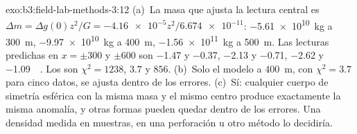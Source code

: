 \begin{solution}{exo:b3:field-lab-methods-3:12}
(a)~La masa que ajusta la lectura central es $\Delta m = \Delta g(0)z^2/G
= \num{-4.16e-5}z^2/\num{6.674e-11}$: \qty{-5.61e10}{kg} a
\qty{300}{m}, \qty{-9.97e10}{kg} a \qty{400}{m}, \qty{-1.56e11}{kg} a
\qty{500}{m}. Las lecturas predichas en $x = \pm300$ y $\pm600$ son
\num{-1.47} y \num{-0.37}, \num{-2.13} y \num{-0.71}, \num{-2.62}
y \qty{-1.09}{\milli\gal}. Los  son $\chi^2 = 1238$, $3.7$ y
$856$. (b)~Solo el modelo a \qty{400}{m}, con $\chi^2 = 3.7$ para cinco
datos, se ajusta dentro de los errores. (c)~Sí: cualquier cuerpo de simetría esférica
con la misma masa y el mismo centro produce exactamente la misma anomalía, y otras
formas pueden quedar dentro de los errores. Una densidad medida en muestras, en
una perforación u otro método lo decidiría.
\end{solution}

